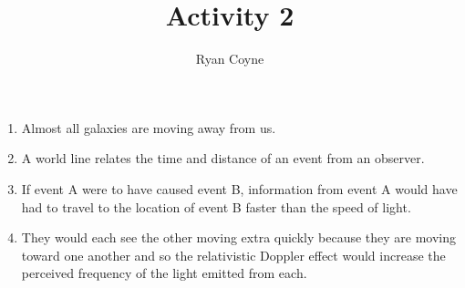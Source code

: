 \documentclass[12pt]{article}
\begin{document}
    \title{Activity 2}
    \author{Ryan Coyne}
    \maketitle

    \begin{enumerate}
        \item Almost all galaxies are moving away from us.
        \item A world line relates the time and distance of an event from an observer.
        \item If event A were to have caused event B, information from event A would have had to travel to the location of event B faster than the speed of light.
        \item They would each see the other moving extra quickly because they are moving toward one another and so the relativistic Doppler effect would increase the perceived frequency of the light emitted from each.
    \end{enumerate}
\end{document}
